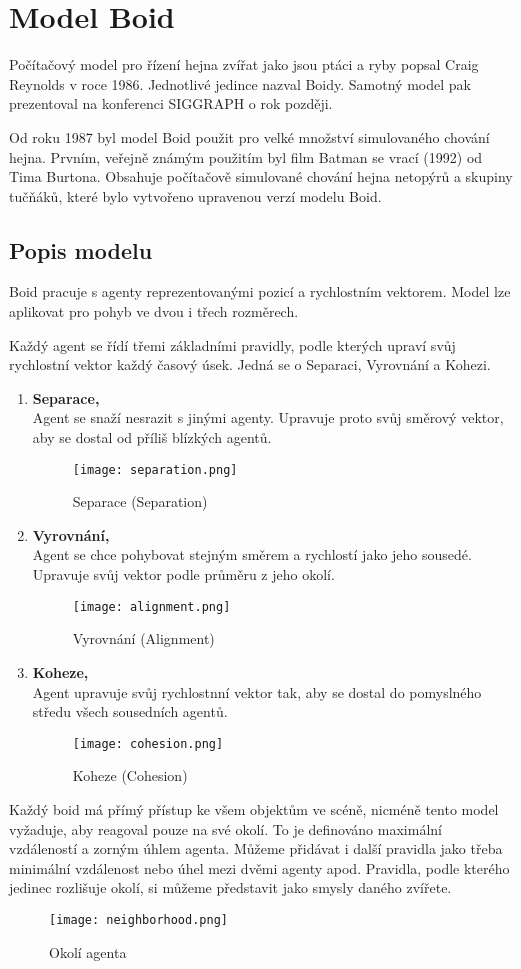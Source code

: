 \section{Model Boid}
Počítačový model pro řízení hejna zvířat jako jsou ptáci a ryby popsal Craig Reynolds v roce 1986. Jednotlivé jedince nazval Boidy. Samotný model pak prezentoval na konferenci SIGGRAPH o rok později. 
\par
Od roku 1987 byl model Boid použit pro velké množství simulovaného chování hejna. Prvním, veřejně známým použitím byl film Batman se vrací (1992) od Tima Burtona. Obsahuje počítačově simulované chování hejna netopýrů a skupiny tučňáků, které bylo vytvořeno upravenou verzí modelu Boid. \cite{ReynoldsBoid}

\subsection{Popis modelu}
Boid pracuje s agenty reprezentovanými pozicí a rychlostním vektorem. Model lze aplikovat pro pohyb ve dvou i třech rozměrech. 
\par
Každý agent se řídí třemi základními pravidly, podle kterých upraví svůj rychlostní vektor každý časový úsek. Jedná se o Separaci, Vyrovnání a Kohezi. 

\newcommand\litem[1]{\item{\bfseries #1,\\}}
\begin{enumerate}
	\litem {Separace}
	Agent se snaží nesrazit s jinými agenty. Upravuje proto svůj směrový vektor, aby se dostal od příliš blízkých agentů. 
	\begin{figure}[H]
		\texttt{[image: separation.png]}
		\centering
		\caption{Separace (Separation) \cite{ReynoldsBoid}}
	\end{figure}

	\litem {Vyrovnání}
	Agent se chce pohybovat stejným směrem a rychlostí jako jeho sousedé. Upravuje svůj vektor podle průměru z jeho okolí. 
	\begin{figure}[H]
		\texttt{[image: alignment.png]}
		\centering
		\caption{Vyrovnání (Alignment) \cite{ReynoldsBoid}}
	\end{figure}

	\litem {Koheze}
	Agent upravuje svůj rychlostnní vektor tak, aby se dostal do pomyslného středu všech sousedních agentů. 
	\begin{figure}[H]
		\texttt{[image: cohesion.png]}
		\centering
		\caption{Koheze (Cohesion) \cite{ReynoldsBoid}}
	\end{figure}
\end{enumerate}
Každý boid má přímý přístup ke všem objektům ve scéně, nicméně tento model vyžaduje, aby reagoval pouze na své okolí. To je definováno maximální vzdáleností a zorným úhlem agenta. Můžeme přidávat i další pravidla jako třeba minimální vzdálenost nebo úhel mezi dvěmi agenty apod. Pravidla, podle kterého jedinec rozlišuje okolí, si můžeme představit jako smysly daného zvířete.  
\begin{figure}[H]
	\texttt{[image: neighborhood.png]}
	\centering
	\caption{Okolí agenta \cite{ReynoldsBoid}}
\end{figure}

